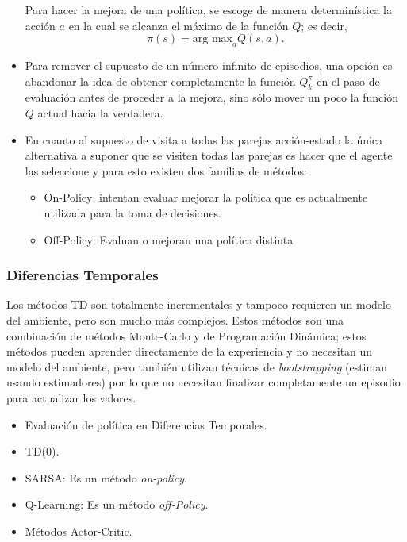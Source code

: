 \documentclass[11pt]{article}
\theoremstyle{plain}
\begin{document}
\begin{itemize}
Para hacer la mejora de una política, se escoge de manera determinística la acción $a$ en la cual se alcanza el máximo de la función $Q$; es decir,
\[ \pi(s) = \textrm{arg max}_a Q(s,a).\]
\item Para remover el supuesto de un número infinito de episodios, una opción es abandonar la idea de obtener completamente la función $Q^\pi_k$ en el paso de evaluación antes de proceder a la mejora, sino sólo mover un poco la función $Q$ actual hacia la verdadera.
\item En cuanto al supuesto de visita a todas las parejas acción-estado la única alternativa a suponer que se visiten todas las parejas es hacer que el agente las seleccione y para esto existen dos familias de métodos:
		\begin{itemize}
				\item On-Policy: intentan evaluar mejorar la política que es actualmente utilizada para la toma de decisiones.
				\item Off-Policy: Evaluan o mejoran una política distinta
		\end{itemize}
\end{itemize}
\subsubsection{Diferencias Temporales}
Los métodos TD son totalmente incrementales y tampoco requieren un modelo del ambiente, pero son mucho más complejos. Estos métodos son una combinación de métodos Monte-Carlo y de Programación Dinámica; estos métodos pueden aprender directamente de la experiencia y no necesitan un modelo del ambiente, pero también utilizan técnicas de \textit{bootstrapping} (estiman usando estimadores) por lo que no necesitan finalizar completamente un episodio para actualizar los valores.
\begin{itemize}
\item Evaluación de política en Diferencias Temporales.
\item TD(0).
\item SARSA: Es un método \textit{on-policy}.
\item Q-Learning: Es un método \textit{off-Policy}.
\item Métodos Actor-Critic.
\end{itemize}
\end{document}
